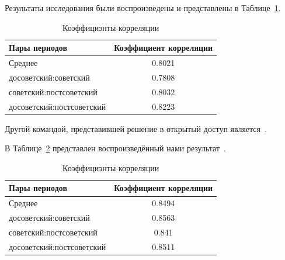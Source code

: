 \documentclass[LI,VKR]{HSEUniversity}
\begin{document}
Результаты исследования были воспроизведены и представлены в Таблице~\ref{tab:GlossReader}.

\begin{table}[H]
\centering
\caption{Коэффициэнты корреляции}
\label{tab:GlossReader}
\begin{tabular}{|l|c|}
\hline
Пары периодов                  & Коэффициент корреляции \\
\hline
Среднее            & 0.8021                  \\
\hline
досоветский:советский           & 0.7808                  \\
\hline
советский:постсоветский          & 0.8032                  \\
\hline
досоветский:постсоветский      & 0.8223                  \\
\hline
\end{tabular}
\end{table}

Другой командой, представившей решение в открытый доступ является~\cite{DeepMistake}.

В Таблице~\ref{tab:DeepMistake} представлен воспроизведённый нами результат~.


\begin{table}[H]
\centering
\caption{Коэффициэнты корреляции}
\label{tab:DeepMistake}
\begin{tabular}{|l|c|}
\hline
Пары периодов                  & Коэффициент корреляции \\
\hline
Среднее            & 0.8494                  \\
\hline
досоветский:советский           & 0.8563                  \\
\hline
советский:постсоветский          & 0.841                  \\
\hline
досоветский:постсоветский      & 0.8511                  \\
\hline
\end{tabular}
\end{table}
\end{document}
